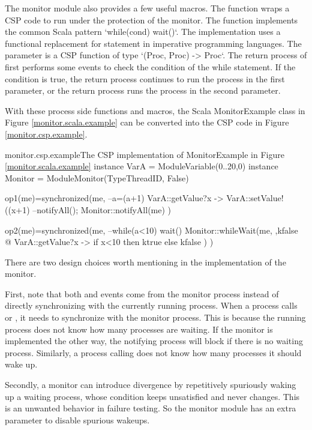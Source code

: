 \documentclass[a4paper, 12pt]{article}
\begin{document}
The monitor module also provides a few useful macros. The  function wraps a CSP code to run under the protection of the monitor. The  function implements the common Scala pattern `while(cond) wait()`. The implementation uses a functional replacement for  statement in imperative programming languages. The  parameter is a CSP function of type `(Proc, Proc) -> Proc`. The return process of  first performs some events to check the condition of the while statement. If the condition is true, the return process continues to run the process in the first parameter, or the return process runs the process in the second parameter.

With these process side functions and macros, the Scala MonitorExample class in Figure \ref{monitor.scala.example} can be converted into the CSP code in Figure \ref{monitor.csp.example}.

\begin{cspfloat}{monitor.csp.example}{The CSP implementation of MonitorExample in Figure \ref{monitor.scala.example}}
instance VarA = ModuleVariable({0..20},0)
instance Monitor = ModuleMonitor(TypeThreadID, False)

op1(me)=synchronized(me,
  --a=(a+1)%
  VarA::getValue?x -> VarA::setValue!((x+1)%
  --notifyAll();
  Monitor::notifyAll(me)
)

op2(me)=synchronized(me,
  --while(a<10) wait()
  Monitor::whileWait(me, \ktrue,kfalse @
    VarA::getValue?x -> if x<10 then ktrue else kfalse
  )
)
\end{cspfloat}
  

There are two design choices worth mentioning in the implementation of the monitor. 

First, note that both  and  events come from the monitor process instead of directly synchronizing with the currently running process. When a process calls  or , it needs to synchronize with the monitor process. This is because the running process does not know how many processes are waiting. If the monitor is implemented the other way, the notifying process will block if there is no waiting process. Similarly, a process calling  does not know how many processes it should wake up. 

Secondly, a monitor can introduce divergence by repetitively spuriously waking up a waiting process, whose condition keeps unsatisfied and never changes. This is an unwanted behavior in failure testing. So the monitor module has an extra parameter  to disable spurious wakeups. 
\end{document}
